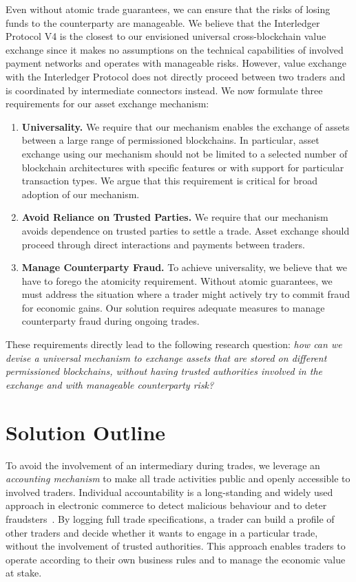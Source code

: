 Even without atomic trade guarantees, we can ensure that the risks of losing funds to the counterparty are manageable.
We believe that the Interledger Protocol V4 is the closest to our envisioned universal cross-blockchain value exchange since it makes no assumptions on the technical capabilities of involved payment networks and operates with manageable risks.
However, value exchange with the Interledger Protocol does not directly proceed between two traders and is coordinated by intermediate connectors instead.
We now formulate three requirements for our asset exchange mechanism:

\begin{enumerate}
	\item \textbf{Universality.} We require that our mechanism enables the exchange of assets between a large range of permissioned blockchains.
	In particular, asset exchange using our mechanism should not be limited to a selected number of blockchain architectures with specific features or with support for particular transaction types.
	We argue that this requirement is critical for broad adoption of our mechanism.
	\item \textbf{Avoid Reliance on Trusted Parties.} We require that our mechanism avoids dependence on trusted parties to settle a trade. Asset exchange should proceed through direct interactions and payments between traders.
	\item \textbf{Manage Counterparty Fraud.} To achieve universality, we believe that we have to forego the atomicity requirement.
	Without atomic guarantees, we must address the situation where a trader might actively try to commit fraud for economic gains.
	Our solution requires adequate measures to manage counterparty fraud during ongoing trades.
\end{enumerate}

These requirements directly lead to the following research question: \emph{how can we devise a universal mechanism to exchange assets that are stored on different permissioned blockchains, without having trusted authorities involved in the exchange and with manageable counterparty risk?}

\section{Solution Outline}
\label{sec:solution_outline}
To avoid the involvement of an intermediary during trades, we leverage an \emph{accounting mechanism} to make all trade activities public and openly accessible to involved traders.
Individual accountability is a long-standing and widely used approach in electronic commerce to detect malicious behaviour and to deter fraudsters~\cite{kailar1996accountability,de2018real}.
By logging full trade specifications, a trader can build a profile of other traders and decide whether it wants to engage in a particular trade, without the involvement of trusted authorities.
This approach enables traders to operate according to their own business rules and to manage the economic value at stake.

